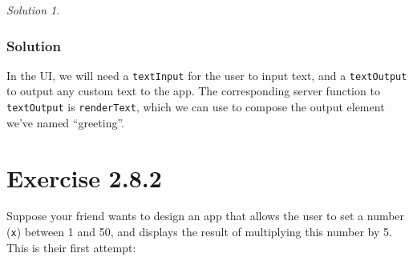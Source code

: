 \documentclass[
]{book}
\newenvironment{Shaded}{\begin{snugshade}}{\end{snugshade}}
\newcommand{\ControlFlowTok}[1]{\textcolor[rgb]{0.13,0.29,0.53}{\textbf{#1}}}
\newcommand{\FunctionTok}[1]{\textcolor[rgb]{0.00,0.00,0.00}{#1}}
\newcommand{\NormalTok}[1]{#1}
\newcommand{\OtherTok}[1]{\textcolor[rgb]{0.56,0.35,0.01}{#1}}
\newcommand{\SpecialCharTok}[1]{\textcolor[rgb]{0.00,0.00,0.00}{#1}}
\newcommand{\StringTok}[1]{\textcolor[rgb]{0.31,0.60,0.02}{#1}}
\theoremstyle{definition}
\theoremstyle{definition}
\theoremstyle{definition}
\theoremstyle{definition}
\theoremstyle{remark}
\newtheorem*{solution}{Solution}
\begin{document}
\begin{solution}
\leavevmode

\hypertarget{solution}{%
\subsubsection*{Solution}\label{solution}}

In the UI, we will need a \texttt{textInput} for the user to input text, and
a \texttt{textOutput} to output any custom text to the app. The corresponding server
function to \texttt{textOutput} is \texttt{renderText}, which we can use to compose the
output element we've named ``greeting''.

\begin{Shaded}
\end{Shaded}

\end{solution}

\hypertarget{exercise-2.8.2}{%
\section*{Exercise 2.8.2}\label{exercise-2.8.2}}

Suppose your friend wants to design an app that allows the user to set a number
(\texttt{x}) between 1 and 50, and displays the result of multiplying this number by
5. This is their first attempt:
\end{document}
